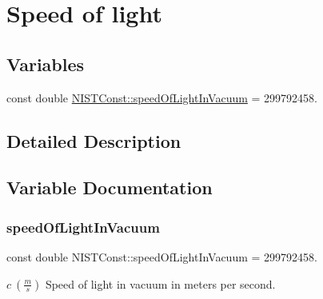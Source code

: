 \hypertarget{group___speed_of_light}{}\section{Speed of light}
\label{group___speed_of_light}
\subsection*{Variables}
\begin{DoxyCompactItemize}
\item 
const double \hyperlink{group___speed_of_light_gacb4a04d9cca33259effabdd28c28e964}{N\+I\+S\+T\+Const\+::speed\+Of\+Light\+In\+Vacuum} = 299792458.
\end{DoxyCompactItemize}


\subsection{Detailed Description}


\subsection{Variable Documentation}
\mbox{\label{group___speed_of_light_gacb4a04d9cca33259effabdd28c28e964}} 
\subsubsection{\texorpdfstring{speed\+Of\+Light\+In\+Vacuum}{speedOfLightInVacuum}}
{\footnotesize\ttfamily const double N\+I\+S\+T\+Const\+::speed\+Of\+Light\+In\+Vacuum = 299792458.}

$c \ (\frac{m}{s})$ Speed of light in vacuum in meters per second. 